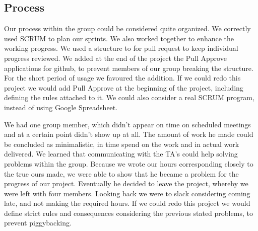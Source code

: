 

\subsection{Process}
Our process within the group could be considered quite organized. We correctly used SCRUM to plan our sprints. We also worked together to enhance the working progress. We used a structure to for pull request to keep individual progress reviewed. We added at the end of the project the Pull Approve applications for github, to prevent members of our group breaking the structure. For the short period of usage we favoured the addition. If we could redo this project we would add Pull Approve at the beginning of the project, including defining the rules attached to it. We could also consider a real SCRUM program, instead of using Google Spreadsheet.


We had one group member, which didn't appear on time on scheduled meetings and at a certain point didn't show up at all. The amount of work he made could be concluded as minimalistic, in time spend on the work and in actual work delivered. We learned that communicating with the TA's could help solving problems within the group. Because we wrote our hours corresponding closely to the true ours made, we were able to show that he became a problem for the progress of our project. Eventually he decided to leave the project, whereby we were left with four members. Looking back we were to slack considering coming late, and not making the required hours. If we could redo this project we would define strict rules and consequences considering the previous stated problems, to prevent piggybacking.

